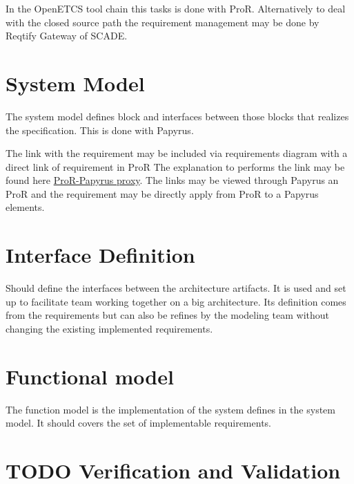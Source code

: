 \documentclass[11pt]{template/openetcs_report}
\begin{document}
In the OpenETCS tool chain this tasks is done with ProR.
Alternatively to deal with the closed source path the requirement management may
be done by Reqtify Gateway of SCADE. 

\section{System Model}
\label{sec-5}

The system model defines block and interfaces between those blocks that realizes
the specification.
This is done with Papyrus. 

The link with the requirement may be included via requirements diagram with a
direct link of requirement in ProR
The explanation to performs the link may be found here \href{https://github.com/openETCS/toolchain/wiki/User-Documentation#tracing-requirements-and-sysml-models}{ProR-Papyrus proxy}.
The links may be viewed through Papyrus an ProR and the requirement may be
directly apply from ProR to a Papyrus elements.


\section{Interface Definition}
\label{sec-6}

Should define the interfaces between the architecture artifacts.  It is used and
set up to facilitate team working together on a big architecture. Its definition
comes from the requirements but can also be refines by the modeling team without
changing the existing implemented requirements.

\section{Functional model}
\label{sec-7}
The function model is the implementation of the system defines in the system
model. It should covers the set of implementable requirements.

\section{{\bfseries\sffamily TODO} Verification and Validation}
\label{sec-8}
\end{document}
